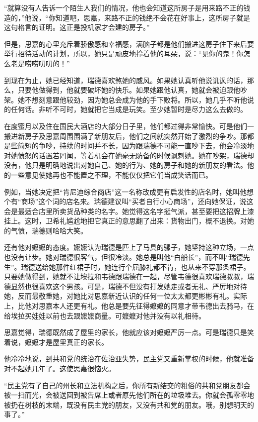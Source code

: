 \par “就算没有人告诉一个陌生人我们的情况，他也会知道这所房子是用来路不正的钱造的，”他说，“你知道吧，思嘉，来路不正的钱绝不会花在好事上，这所房子就是这句格言的证明。这正是投机家才会建的房子。”
\par 但是，思嘉的心里充斥着骄傲感和幸福感，满脑子都是他们搬进这房子住下来后要举行招待活动的计划，所以，她只是顽皮地拎着他的耳朵，说：“见你的鬼！你怎么老是唠唠叨叨的！”
\par 到现在为止，她已经知道，瑞德喜欢煞她的威风。如果她认真听他说讥讽的话，那么，只要他做得到，他就要破坏她的快乐。如果她跟他认真，她就会被迫跟他吵架。她不想刻意跟他较劲，因为她总会成为他的手下败将。所以，她几乎不听他说的任何话。非听不可时，她就把它当成是玩笑。至少她暂时是尽力这么去做的。
\par 在度蜜月以及住在国民大酒店的大部分日子里，他们都过得非常愉快。可是他们一搬进新房子及思嘉周围围满了新朋友后，他们之间就突然开始了激烈的争吵。那都是些简短的争吵，持续的时间并不长，因为跟瑞德不可能一直吵下去，他会冷淡地对她愤怒的话置若罔闻，等着机会在她毫无防备的时候讽刺她。她在吵架，瑞德却没有，他只是明确地说出对她自己、她的行为、她的房子和她的新朋友的看法。他的一些意见使她再也不能置之不理，不能仅仅把它们当成笑话而已。
\par 例如，当她决定把“肯尼迪综合商店”这一名称改成更有启发性的店名时，她叫他想个有“商场”这个词的店名来。瑞德建议叫“买者自行小心商场”，还向她保证，说这会是最适合店里所卖货品种类的名字。她觉得这名字挺气派，甚至要把这招牌上漆挂上。这时，卫希礼尴尬地把它真正的意思翻了出来：货物出门，概不退换。对她的气愤，瑞德则哈哈大笑。
\par 还有他对嬷嬷的态度。嬷嬷认为瑞德是匹上了马具的骡子，她坚持这种立场，一点也没有让步。她对瑞德很客气，但很冷淡。她总是叫他“白船长”，而不叫“瑞德先生”。瑞德送给她那件红裙子时，她连行个屈膝礼都不肯，也从来不穿那条裙子。只要她做得到，她就不让埃拉和韦德跟瑞德在一起，尽管韦德很喜欢瑞德叔叔，瑞德显然也很喜欢这个男孩。可是，瑞德不但没有打发她走或者无礼、严厉地对待她，反而最敬重她，对她比对思嘉新近认识的任何一位太太都更彬彬有礼。实际上，比他对思嘉本人还更有礼。他总是要先征得嬷嬷的同意才带韦德出去骑马，在给埃拉买娃娃以前也去跟嬷嬷商量。可嬷嬷对他并没有以礼相待。
\par 思嘉觉得，瑞德既然成了屋里的家长，他就应该对嬷嬷严厉一点。可是瑞德只是笑着说，嬷嬷才是屋里真正的家长。
\par 他冷冷地说，到共和党的统治在佐治亚失势，民主党又重新掌权的时候，他就准备对不起她几年了。这使思嘉很恼火。
\par “民主党有了自己的州长和立法机构之后，你所有新结交的粗俗的共和党朋友都会被一扫而光，会被送回到被告席上或者原先他们所在的垃圾堆去。你就会孤零零地被扔在树枝的末端，既没有民主党的朋友，又没有共和党的朋友。哦，别想明天的事了。”
